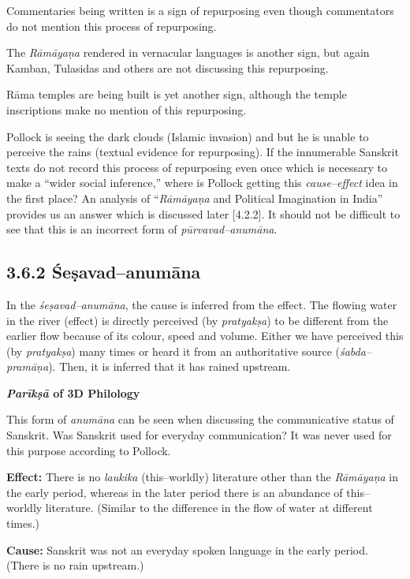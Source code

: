 \item Commentaries being written is a sign of repurposing even though commentators do not mention this process of repurposing.

 \item The \textit{Rāmāyaṇa }rendered in vernacular languages is another sign, but again Kamban, Tulasidas and others are not discussing this repurposing.

 \item Rāma temples are being built is yet another sign, although the temple inscriptions make no mention of this repurposing.

Pollock is seeing the dark clouds (Islamic invasion) and but he is unable to perceive the rains (textual evidence for repurposing). If the innumerable Sanskrit texts do not record this process of repurposing even once which is necessary to make a “wider social inference,” where is Pollock getting this \textit{cause–effect} idea in the first place? An analysis of “\textit{Rāmāyaṇa }and Political Imagination in India” provides us an answer which is discussed later [4.2.2]. It should not be difficult to see that this is an incorrect form of \textit{pūrvavad–anumāna}.


\subsection*{3.6.2 Śeṣavad–anumāna}

In the \textit{śeṣavad–anumāna}, the cause is inferred from the effect. The flowing water in the river (effect) is directly perceived (by \textit{pratyakṣa}) to be different from the earlier flow because of its colour, speed and volume. Either we have perceived this (by \textit{pratyakṣa}) many times or heard it from an authoritative source (\textit{śabda–pramāṇa}). Then, it is inferred that it has rained upstream.

\textbf{\textit{Parīkṣā} of 3D Philology}

This form of \textit{anumāna} can be seen when discussing the communicative status of Sanskrit. Was Sanskrit used for everyday communication? It was never used for this purpose according to Pollock.

\textbf{Effect:} There is no \textit{laukika} (this–worldly) literature other than the \textit{Rāmāyaṇa }in the early period, whereas in the later period there is an abundance of this–worldly literature. (Similar to the difference in the flow of water at different times.)

\textbf{Cause:} Sanskrit was not an everyday spoken language in the early period. (There is no rain upstream.)

